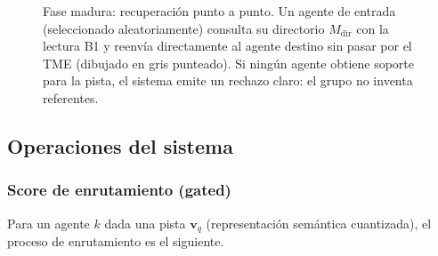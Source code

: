 \begin{figure}[H]
{%
}
\caption{Fase madura: recuperación punto a punto.
Un agente de entrada (seleccionado aleatoriamente) consulta su directorio $M_{\mathrm{dir}}$
con la lectura B1 y reenvía directamente al agente destino sin pasar por el TME
(dibujado en gris punteado).
Si ningún agente obtiene soporte para la pista, el sistema emite un rechazo
claro: el grupo no inventa referentes.}
\label{fig:arq-madura}
\end{figure}

\subsection{Operaciones del sistema}
\label{sec:operaciones}

\subsubsection*{Score de enrutamiento (gated)}

Para un agente $k$ dada una pista $\mathbf{v}_q$ (representación semántica cuantizada),
el proceso de enrutamiento es el siguiente.

